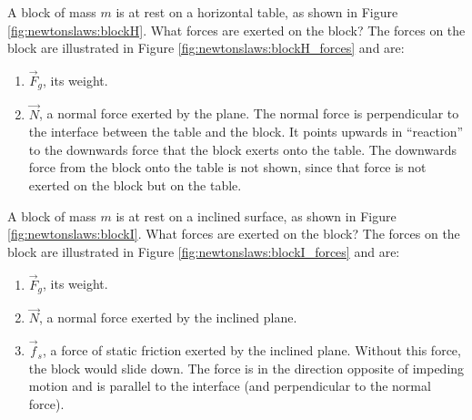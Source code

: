 \begin{example}{A block of mass $m$ is at rest on a horizontal table, as shown in Figure \ref{fig:newtonslaws:blockH}. What forces are exerted on the block? }
The forces on the block are illustrated in Figure \ref{fig:newtonslaws:blockH_forces} and are:
\begin{enumerate}
\item $\vec F_g$, its weight.
\item $\vec N$, a normal force exerted by the plane. The normal force is perpendicular to the interface between the table and the block. It points upwards in ``reaction'' to the downwards force that the block exerts onto the table. The downwards force from the block onto the table is not shown, since that force is not exerted on the block but on the table.
\end{enumerate}
\end{example}


\begin{example}{A block of mass $m$ is at rest on a inclined surface, as shown in Figure \ref{fig:newtonslaws:blockI}. What forces are exerted on the block? }
\label{ex:newtonslaws:blockI}
The forces on the block are illustrated in Figure \ref{fig:newtonslaws:blockI_forces} and are:
\begin{enumerate}
\item $\vec F_g$, its weight.
\item $\vec N$, a normal force exerted by the inclined plane.
\item $\vec f_s$, a force of static friction exerted by the inclined plane. Without this force, the block would slide down. The force is in the direction opposite of impeding motion and is parallel to the interface (and perpendicular to the normal force).
\end{enumerate}

\end{example}

